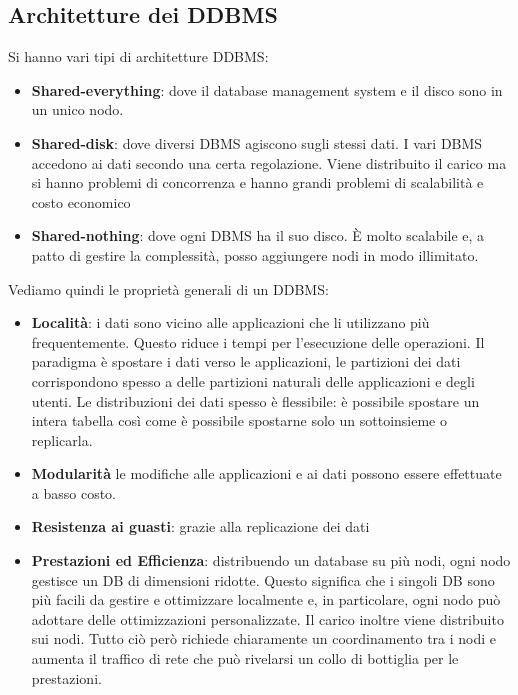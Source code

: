 \subsection{Architetture dei DDBMS}
Si hanno vari tipi di architetture DDBMS:
\begin{itemize}
    \item \textbf{Shared-everything}: dove il database management system e il
          disco sono in un unico nodo.
    \item \textbf{Shared-disk}: dove diversi DBMS agiscono sugli stessi dati. I
          vari DBMS accedono ai dati secondo una certa regolazione.
          Viene distribuito il carico ma si hanno problemi di concorrenza e
          hanno grandi problemi di scalabilità e costo economico
    \item \textbf{Shared-nothing}: dove ogni DBMS ha il suo disco. È molto
          scalabile e, a patto di gestire la complessità, posso aggiungere nodi
          in modo illimitato.
\end{itemize}
Vediamo quindi le proprietà generali di un DDBMS:
\begin{itemize}
    \item \textbf{Località}: i dati sono vicino alle applicazioni che li
          utilizzano più frequentemente. Questo riduce i tempi per l'esecuzione
          delle operazioni. Il paradigma è spostare i dati verso le
          applicazioni, le partizioni dei dati corrispondono spesso a delle
          partizioni naturali delle applicazioni e degli utenti. Le
          distribuzioni dei dati spesso è flessibile: è possibile spostare un
          intera tabella così come è possibile spostarne solo un sottoinsieme
          o replicarla.
    \item \textbf{Modularità} le modifiche alle applicazioni e ai dati possono
          essere effettuate a basso costo.
    \item \textbf{Resistenza ai guasti}: grazie alla replicazione dei dati
    \item \textbf{Prestazioni ed Efficienza}: distribuendo un database su più
          nodi, ogni nodo gestisce un DB di dimensioni ridotte. Questo
          significa che i singoli DB sono più facili da gestire e ottimizzare
          localmente e, in particolare, ogni nodo può adottare delle
          ottimizzazioni personalizzate. Il carico inoltre viene distribuito
          sui nodi. Tutto ciò però richiede chiaramente un coordinamento tra i
          nodi e aumenta il traffico di rete che può rivelarsi un collo di
          bottiglia per le prestazioni.
\end{itemize}

